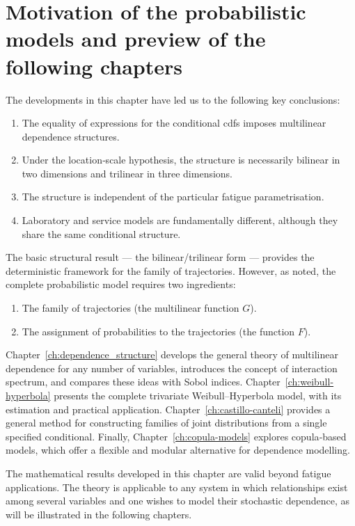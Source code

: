 \section{Motivation of the probabilistic models and preview of the following chapters}
\label{sec:motivation-probabilistic}

The developments in this chapter have led us to the following key conclusions:

\begin{enumerate}
    \item The equality of expressions for the conditional cdfs imposes multilinear dependence structures.
    \item Under the location‑scale hypothesis, the structure is necessarily bilinear in two dimensions and trilinear in three dimensions.
    \item The structure is independent of the particular fatigue parametrisation.
    \item Laboratory and service models are fundamentally different, although they share the same conditional structure.
\end{enumerate}

The basic structural result — the bilinear/trilinear form — provides the deterministic framework for the family of trajectories. However, as noted, the complete probabilistic model requires two ingredients:
\begin{enumerate}
    \item The family of trajectories (the multilinear function $G$).
    \item The assignment of probabilities to the trajectories (the function $F$).
\end{enumerate}

Chapter~\ref{ch:dependence_structure} develops the general theory of multilinear dependence for any number of variables, introduces the concept of interaction spectrum, and compares these ideas with Sobol indices. Chapter~\ref{ch:weibull-hyperbola} presents the complete trivariate Weibull–Hyperbola model, with its estimation and practical application. Chapter~\ref{ch:castillo-canteli} provides a general method for constructing families of joint distributions from a single specified conditional. Finally, Chapter~\ref{ch:copula-models} explores copula‑based models, which offer a flexible and modular alternative for dependence modelling.

The mathematical results developed in this chapter are valid beyond fatigue applications. The theory is applicable to any system in which relationships exist among several variables and one wishes to model their stochastic dependence, as will be illustrated in the following chapters.

